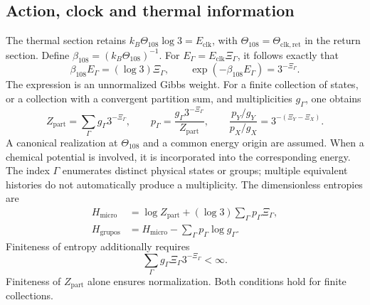 \subsection{Action, clock and thermal information}
\label{md:hib:termica}

The thermal section retains
$k_B\Theta_{108}\log3=E_{\mathrm{clk}}$, with
$\Theta_{108}=\Theta_{\mathrm{clk,ret}}$ in the return section.
Define $\beta_{108}=(k_B\Theta_{108})^{-1}$. For
$E_\Gamma=E_{\mathrm{clk}}\Xi_\Gamma$, it follows exactly that
\begin{equation}
 \beta_{108}E_\Gamma=(\log3)\Xi_\Gamma,
 \qquad
 \boxed{\exp(-\beta_{108}E_\Gamma)=3^{-\Xi_\Gamma}.}
 \label{md:hib:peso-termico}
\end{equation}
The expression is an unnormalized Gibbs weight. For a finite collection of
states, or a collection with a convergent partition sum, and multiplicities
$g_\Gamma$, one obtains
\begin{equation}
 Z_{\mathrm{part}}=\sum_\Gamma g_\Gamma3^{-\Xi_\Gamma},\qquad
 p_\Gamma=\frac{g_\Gamma3^{-\Xi_\Gamma}}{Z_{\mathrm{part}}},\qquad
 \frac{p_Y/g_Y}{p_X/g_X}=3^{-(\Xi_Y-\Xi_X)}.
 \label{md:hib:particion}
\end{equation}
A canonical realization at $\Theta_{108}$ and a common energy origin are
assumed. When a chemical potential is involved, it is incorporated into
the corresponding energy. The index $\Gamma$ enumerates distinct physical
states or groups; multiple equivalent histories do not automatically
produce a multiplicity. The dimensionless entropies are
\begin{equation}
 \begin{aligned}
 H_{\mathrm{micro}}
 &=\log Z_{\mathrm{part}}+(\log3)\sum_\Gamma p_\Gamma\Xi_\Gamma,\\
 H_{\mathrm{grupos}}
 &=H_{\mathrm{micro}}-\sum_\Gamma p_\Gamma\log g_\Gamma.
 \end{aligned}
 \label{md:hib:entropias}
\end{equation}
Finiteness of entropy additionally requires
\begin{equation}
 \sum_\Gamma g_\Gamma\Xi_\Gamma3^{-\Xi_\Gamma}<\infty.
 \label{md:hib:condicion-entropia}
\end{equation}
Finiteness of $Z_{\mathrm{part}}$ alone ensures normalization.
Both conditions hold for finite collections.


